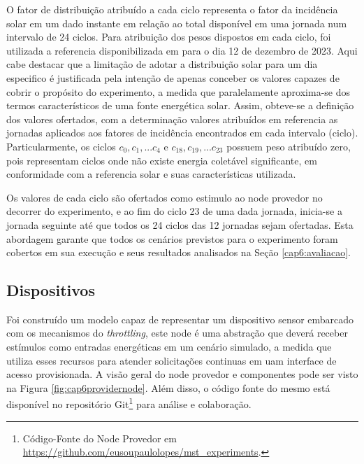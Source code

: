 O fator de distribuição atribuído a cada ciclo representa o fator da incidência solar em um dado instante em relação ao total disponível em uma jornada num intervalo de 24 ciclos. Para atribuição dos pesos dispostos em cada ciclo, foi utilizada a referencia disponibilizada em  para o dia 12 de dezembro de 2023. Aqui cabe destacar que a limitação de adotar a distribuição solar para um dia especifico é justificada pela intenção de apenas conceber os valores capazes de cobrir o propósito do experimento, a medida que paralelamente aproxima-se dos termos característicos de  uma fonte energética solar. Assim, obteve-se a definição dos valores ofertados, com a determinação valores atribuídos em referencia as jornadas aplicados aos fatores de incidência encontrados em cada intervalo (ciclo). Particularmente, os ciclos $c_0, c_1,... c_4$ e $c_{18}, c_{19},... c_{23}$ possuem peso atribuído zero, pois representam ciclos onde não existe energia coletável significante, em conformidade com a referencia solar e suas características utilizada.

Os valores de cada ciclo são ofertados como estimulo ao node provedor no decorrer do experimento, e ao fim do ciclo 23 de uma dada jornada, inicia-se a jornada seguinte até que todos os 24 ciclos das 12 jornadas sejam ofertadas. Esta abordagem garante que todos os cenários previstos para o experimento foram cobertos em sua execução e seus resultados analisados na Seção \ref{cap6:avaliacao}.

\subsection{Dispositivos}

Foi construído um modelo capaz de representar um dispositivo sensor embarcado com os mecanismos do \textit{throttling}, este node é uma abstração que deverá receber estímulos como entradas energéticas em um cenário simulado, a medida que utiliza esses recursos para atender solicitações continuas em uam interface de acesso provisionada. A visão geral do node provedor e componentes pode ser visto na Figura \ref{fig:cap6providernode}. Além disso, o código fonte do mesmo está disponível no repositório Git\footnote{Código-Fonte do Node Provedor em \url{https://github.com/eusoupaulolopes/mst_experiments}.}  para análise e colaboração.

